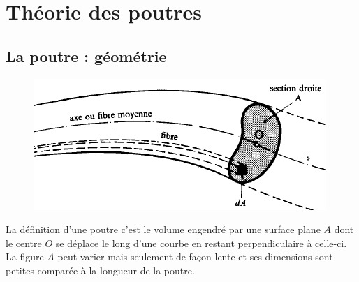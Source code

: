 \newpage
\section{Théorie des poutres}
	\subsection{La poutre : géométrie}
	\begin{figure}
	\vspace{-5mm}
	\includegraphics[scale=0.35]{ch2/image3.png}
	\end{figure}
	La définition d'une poutre c'est le volume engendré par une surface 
	plane $A$ dont le centre $O$ se déplace le long d'une courbe en 
	restant perpendiculaire à celle-ci. La figure $A$ peut varier mais 
	seulement de façon lente et ses dimensions sont petites comparée à 
	la longueur de la poutre.
	
	
